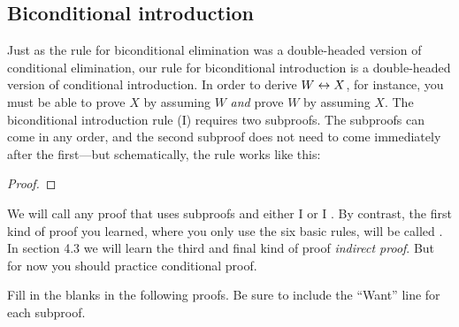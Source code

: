 \subsection{Biconditional introduction}

Just as the rule for biconditional elimination was a double-headed version of conditional elimination, our rule for biconditional introduction is a double-headed version of conditional introduction. In order to derive $W \leftrightarrow X$, for instance, you must be able to prove $X$ by assuming $W$ \emph{and} prove $W$ by assuming $X$. The biconditional introduction rule ({\eiff}I) requires two subproofs. The subproofs can come in any order, and the second subproof does not need to come immediately after the first---but schematically, the rule works like this:

\begin{proof}
	\open
		 
	\close
	\open
		 
	\close
\end{proof}

We will call any proof that uses subproofs and either \eif I or \eiff I . By contrast, the first kind of proof you learned, where you only use the six basic rules, will be called . In section 4.3 we will learn the third and final  kind of proof \emph{indirect proof}. But for now you should practice conditional proof. 

\practiceproblems
\noindent\problempart Fill in the blanks in the following proofs. Be sure to include the ``Want'' line for each subproof.  %

